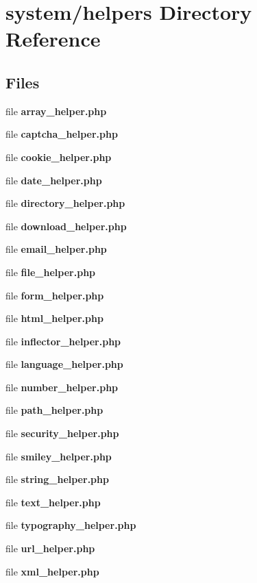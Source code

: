\section{system/helpers Directory Reference}
\label{dir_8a21fd3abc083796b657b5dbb68fbead}
\subsection*{Files}
\begin{DoxyCompactItemize}
\item 
file {\bf array\-\_\-helper.\-php}
\item 
file {\bf captcha\-\_\-helper.\-php}
\item 
file {\bf cookie\-\_\-helper.\-php}
\item 
file {\bf date\-\_\-helper.\-php}
\item 
file {\bf directory\-\_\-helper.\-php}
\item 
file {\bf download\-\_\-helper.\-php}
\item 
file {\bf email\-\_\-helper.\-php}
\item 
file {\bf file\-\_\-helper.\-php}
\item 
file {\bf form\-\_\-helper.\-php}
\item 
file {\bf html\-\_\-helper.\-php}
\item 
file {\bf inflector\-\_\-helper.\-php}
\item 
file {\bf language\-\_\-helper.\-php}
\item 
file {\bf number\-\_\-helper.\-php}
\item 
file {\bf path\-\_\-helper.\-php}
\item 
file {\bf security\-\_\-helper.\-php}
\item 
file {\bf smiley\-\_\-helper.\-php}
\item 
file {\bf string\-\_\-helper.\-php}
\item 
file {\bf text\-\_\-helper.\-php}
\item 
file {\bf typography\-\_\-helper.\-php}
\item 
file {\bf url\-\_\-helper.\-php}
\item 
file {\bf xml\-\_\-helper.\-php}
\end{DoxyCompactItemize}
